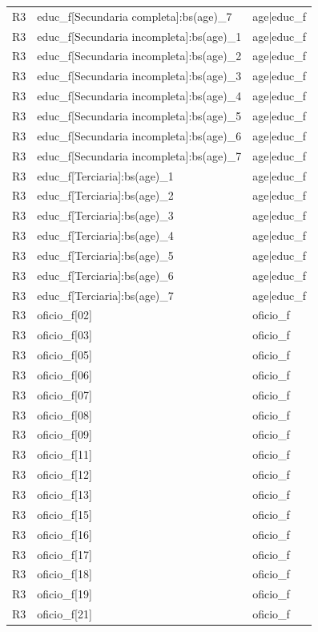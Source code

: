 \begin{longtable}{lll}
R3 & educ\_f[Secundaria completa]:bs(age)\_7 & age|educ\_f \\
R3 & educ\_f[Secundaria incompleta]:bs(age)\_1 & age|educ\_f \\
R3 & educ\_f[Secundaria incompleta]:bs(age)\_2 & age|educ\_f \\
R3 & educ\_f[Secundaria incompleta]:bs(age)\_3 & age|educ\_f \\
R3 & educ\_f[Secundaria incompleta]:bs(age)\_4 & age|educ\_f \\
R3 & educ\_f[Secundaria incompleta]:bs(age)\_5 & age|educ\_f \\
R3 & educ\_f[Secundaria incompleta]:bs(age)\_6 & age|educ\_f \\
R3 & educ\_f[Secundaria incompleta]:bs(age)\_7 & age|educ\_f \\
R3 & educ\_f[Terciaria]:bs(age)\_1 & age|educ\_f \\
R3 & educ\_f[Terciaria]:bs(age)\_2 & age|educ\_f \\
R3 & educ\_f[Terciaria]:bs(age)\_3 & age|educ\_f \\
R3 & educ\_f[Terciaria]:bs(age)\_4 & age|educ\_f \\
R3 & educ\_f[Terciaria]:bs(age)\_5 & age|educ\_f \\
R3 & educ\_f[Terciaria]:bs(age)\_6 & age|educ\_f \\
R3 & educ\_f[Terciaria]:bs(age)\_7 & age|educ\_f \\
R3 & oficio\_f[02] & oficio\_f \\
R3 & oficio\_f[03] & oficio\_f \\
R3 & oficio\_f[05] & oficio\_f \\
R3 & oficio\_f[06] & oficio\_f \\
R3 & oficio\_f[07] & oficio\_f \\
R3 & oficio\_f[08] & oficio\_f \\
R3 & oficio\_f[09] & oficio\_f \\
R3 & oficio\_f[11] & oficio\_f \\
R3 & oficio\_f[12] & oficio\_f \\
R3 & oficio\_f[13] & oficio\_f \\
R3 & oficio\_f[15] & oficio\_f \\
R3 & oficio\_f[16] & oficio\_f \\
R3 & oficio\_f[17] & oficio\_f \\
R3 & oficio\_f[18] & oficio\_f \\
R3 & oficio\_f[19] & oficio\_f \\
R3 & oficio\_f[21] & oficio\_f \\

\end{longtable}
